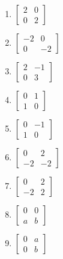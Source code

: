 \begin{multicols}{2}
	\begin{enumerate}[1. ]

		\item $ \begin{bmatrix} 2 & 0 \\ 0 & 2 \end{bmatrix} $\\

		\item $ \begin{bmatrix} -2 & 0 \\ 0 & -2 \end{bmatrix} $

		\item $ \begin{bmatrix} 2 & -1 \\ 0 & 3 \end{bmatrix} $\\

		\item $ \begin{bmatrix} 0 & 1 \\ 1 & 0 \end{bmatrix} $\\

		\item $ \begin{bmatrix} 0 & -1 \\ 1 & 0 \end{bmatrix} $\\

		\item $ \begin{bmatrix} 0 & 2 \\ -2 & -2 \end{bmatrix} $\\

		\item $ \begin{bmatrix} 0 & 2 \\ -2 & 2 \end{bmatrix} $\\

		\item $ \begin{bmatrix} 0 & 0 \\ a & b \end{bmatrix} $\\

		\item $ \begin{bmatrix} 0 & a \\ 0 & b \end{bmatrix} $\\


\end{enumerate}
\end{multicols}

